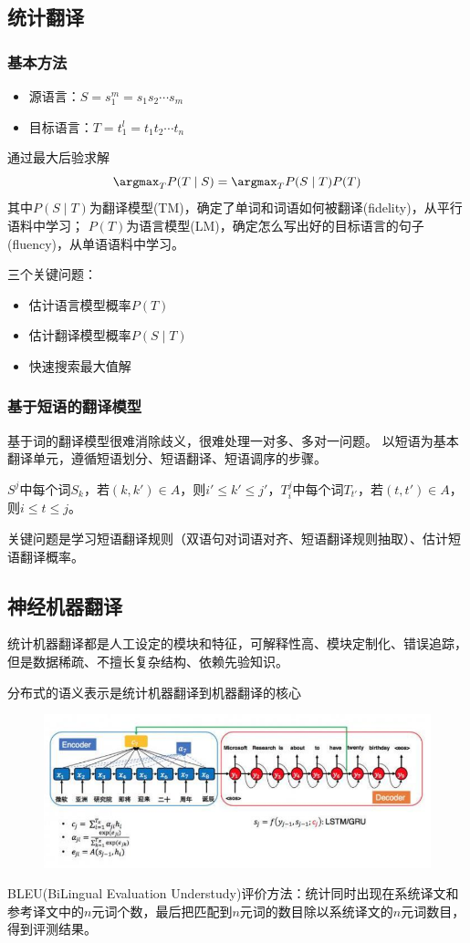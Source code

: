 \subsection{统计翻译}
\subsubsection{基本方法}
\begin{itemize}
	\item 源语言：$S=s_1^m=s_1s_2\cdots s_m$
	\item 目标语言：$T=t_1^l=t_1t_2\cdots t_n$
\end{itemize}
通过最大后验求解
\[\argmax_TP(T\mid S)=\argmax_T P(S\mid T)P(T)\]
其中$P(S\mid T)$为翻译模型(TM)，确定了单词和词语如何被翻译(fidelity)，从平行语料中学习；
$P(T)$为语言模型(LM)，确定怎么写出好的目标语言的句子(fluency)，从单语语料中学习。

三个关键问题：
\begin{itemize}
	\item 估计语言模型概率$P(T)$
	\item 估计翻译模型概率$P(S\mid T)$
	\item 快速搜索最大值解
\end{itemize}

\subsubsection{基于短语的翻译模型}
基于词的翻译模型很难消除歧义，很难处理一对多、多对一问题。
以短语为基本翻译单元，遵循短语划分、短语翻译、短语调序的步骤。
\begin{definition}[对齐一致性]
$S^j$中每个词$S_k$，若$(k,k')\in A$，则$i'\leq k'\leq j'$，$T_i^j$中每个词$T_{t'}$，若$(t,t')\in A$，则$i\leq t\leq j$。
\end{definition}

关键问题是学习短语翻译规则（双语句对词语对齐、短语翻译规则抽取）、估计短语翻译概率。

\subsection{神经机器翻译}
统计机器翻译都是人工设定的模块和特征，可解释性高、模块定制化、错误追踪，但是数据稀疏、不擅长复杂结构、依赖先验知识。

分布式的语义表示是统计机器翻译到机器翻译的核心
\begin{figure}[H]
\centering
\includegraphics[width=0.6\linewidth]{fig/attention.png}
\end{figure}

BLEU(BiLingual Evaluation Understudy)评价方法：统计同时出现在系统译文和参考译文中的$n$元词个数，最后把匹配到$n$元词的数目除以系统译文的$n$元词数目，得到评测结果。